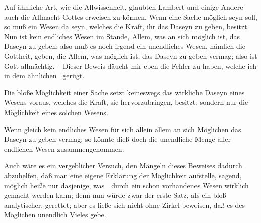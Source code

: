 \begin{RWanm}
Auf ähnliche Art, wie die Allwissenheit, glaubten Lambert und einige Andere auch die Allmacht Gottes erweisen zu können. Wenn eine Sache möglich seyn soll, so muß ein Wesen da seyn, welches die Kraft, ihr das Daseyn zu geben, besitzt. Nun ist kein endliches Wesen im Stande, Allem, was an sich möglich ist, das Daseyn zu geben; also muß es noch irgend ein unendliches Wesen, nämlich die Gottheit, geben, die Allem, was möglich ist, das Daseyn zu geben vermag; also ist Gott allmächtig. -- Dieser Beweis däucht mir eben die Fehler zu haben, welche ich in dem ähnlichen \ gerügt.
\begin{aufzb}
\item Die bloße Möglichkeit einer Sache setzt keineswegs das wirkliche Daseyn eines Wesens voraus, welches die Kraft, sie hervorzubringen, besitzt; sondern nur die Möglichkeit eines solchen Wesens.
\item Wenn gleich kein endliches Wesen für sich allein allem an sich Möglichen das Daseyn zu geben vermag: so könnte dieß doch die unendliche Menge aller endlichen Wesen zusammengenommen.
\item Auch wäre es ein vergeblicher Versuch, den Mängeln dieses Beweises dadurch abzuhelfen, daß man eine eigene Erklärung der Möglichkeit aufstelle, sagend, möglich heiße nur dasjenige, was~\ durch ein schon vorhandenes Wesen wirklich gemacht werden kann; denn nun würde zwar der erste Satz, als ein bloß analytischer, gerettet; aber es ließe sich nicht ohne Zirkel beweisen, daß es des Möglichen unendlich Vieles gebe.
\end{aufzb}
\end{RWanm}
